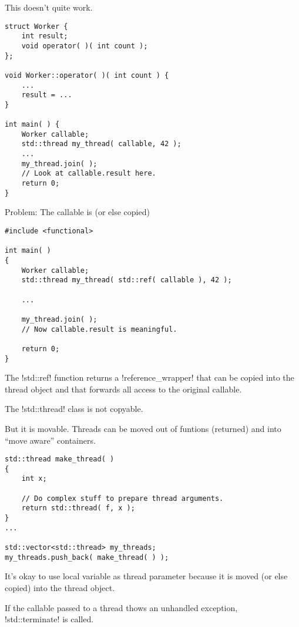 \documentclass[landscape]{slides}
\begin{document}

This doesn't quite work.
\vspace{5mm}
{\small
\begin{lstlisting}
struct Worker {
    int result;
    void operator( )( int count );
};

void Worker::operator( )( int count ) {
    ...
    result = ...
}

int main( ) {
    Worker callable;
    std::thread my_thread( callable, 42 );
    ...
    my_thread.join( );
    // Look at callable.result here.
    return 0;
}
\end{lstlisting}
}
\stopslide


Problem: The callable is  (or else copied)
\vspace{5mm}
{\small
\begin{lstlisting}
#include <functional>

int main( )
{
    Worker callable;
    std::thread my_thread( std::ref( callable ), 42 );

    ...

    my_thread.join( );
    // Now callable.result is meaningful.

    return 0;
}
\end{lstlisting}
}
The !std::ref! function returns a !reference_wrapper! that can be copied into the thread object
and that forwards all access to the original callable.
\stopslide


The !std::thread! class is not copyable. 

But it is movable. Threads can be moved out of funtions (returned) and into ``move aware''
containers.
\vspace{5mm}
{\small
\begin{lstlisting}
std::thread make_thread( )
{
    int x;

    // Do complex stuff to prepare thread arguments.
    return std::thread( f, x );
}
...

std::vector<std::thread> my_threads;
my_threads.push_back( make_thread( ) );
\end{lstlisting}
}
It's okay to use local variable as thread parameter because it is moved (or else copied) into
the thread object.
\stopslide


If the callable passed to a thread thows an unhandled exception,\\
!std::terminate! is called.
\end{document}

